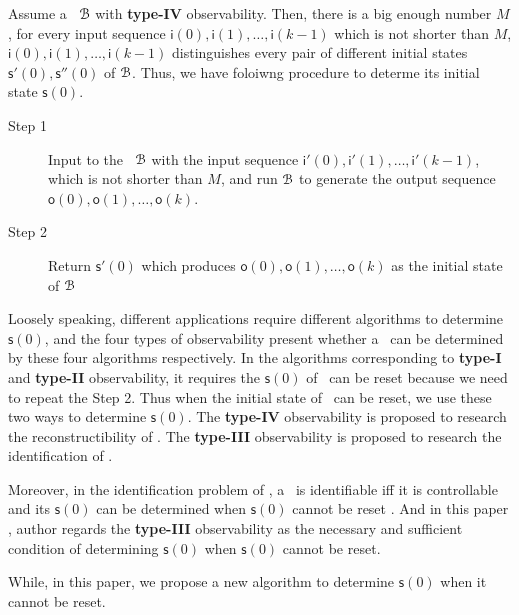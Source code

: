 Assume a \BCN\ ${\mathcal{B}}$  with {\bf type-IV}  observability. Then, there is a big enough number $M$, for every  input sequence $\mathsf{i}(0),\mathsf{i}(1),\ldots, \mathsf{i}(k-1)$ which is not shorter than $M$,  $\mathsf{i}(0),\mathsf{i}(1),\ldots, \mathsf{i}(k-1)$ distinguishes every pair of different initial states $\mathsf{s}'(0), \mathsf{s}''(0)$ of ${\mathcal{B}}$. Thus, we have foloiwng procedure to determe its initial state $\mathsf{s}(0)$.

 \begin{description}
	\item[Step 1]  Input to the \BCN\ ${\mathcal{B}}$ with the input sequence $\mathsf{i}'(0),\mathsf{i}'(1),\ldots, \mathsf{i}'(k-1)$,  which is not shorter than $M$, and run ${\mathcal{B}}$ to generate the output sequence $\mathsf{o}(0),\mathsf{o}(1),\ldots,\mathsf{o}(k)$.
	\item[Step 2] Return $\mathsf{s}'(0)$ which produces $\mathsf{o}(0),\mathsf{o}(1),\ldots,\mathsf{o}(k)$ as the initial state of ${\mathcal{B}}$ 
\end{description}

Loosely speaking, different applications require different algorithms to determine $\mathsf{s}(0)$, and the four types of observability present whether a \BCN\ can be determined by these four algorithms respectively. In the algorithms corresponding to {\bf type-I} and {\bf type-II} observability, it requires the $\mathsf{s}(0)$ of \BCN\ can be reset because we need to repeat the Step 2. Thus when the initial state of \BCN\ can be reset, we use these two ways to determine $\mathsf{s}(0)$. The {\bf type-IV} observability is proposed to research the reconstructibility of \BCN. The {\bf type-III} observability is proposed to research the identification of \BCN. 

Moreover, in the identification problem of \BCNs, a \BCN\ is identifiable iff it is controllable and its $\mathsf{s}(0)$ can be determined when $\mathsf{s}(0)$ cannot be reset \cite{Cheng2011Identification}. And in this paper \cite{Cheng2011Identification}, author regards the {\bf type-III} observability as the necessary and sufficient condition of determining $\mathsf{s}(0)$ when $\mathsf{s}(0)$ cannot be reset. %

While, in this paper, we propose a new algorithm to determine $\mathsf{s}(0)$ when it cannot be reset.%

